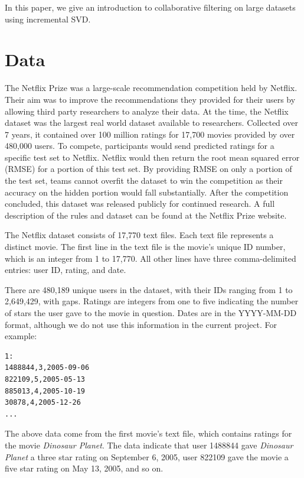 \documentclass{article} %
\begin{document}
In this paper, we give an introduction to collaborative filtering on large datasets using incremental SVD.

\section{Data}

The Netflix Prize was a large-scale recommendation competition held by Netflix.
Their aim was to improve the recommendations they provided for their users by allowing third party researchers to analyze their data.
At the time, the Netflix dataset was the largest real world dataset available to researchers.
Collected over 7 years, it contained over 100 million ratings for 17,700 movies provided by over 480,000 users.
To compete, participants would send predicted ratings for a specific test set to Netflix.
Netflix would then return the root mean squared error (RMSE) for a portion of this test set.
By providing RMSE on only a portion of the test set, teams cannot overfit the dataset to win the competition as their accuracy on the hidden portion would fall substantially.
After the competition concluded, this dataset was released publicly for continued research.
A full description of the rules and dataset can be found at the Netflix Prize website.


The Netflix dataset consists of 17,770 text files.
Each text file represents a distinct movie.
The first line in the text file is the movie's unique ID number, which is an integer from 1 to 17,770.
All other lines have three comma-delimited entries: user ID, rating, and date.

There are 480,189 unique users in the dataset, with their IDs ranging from 1 to 2,649,429, with gaps.
Ratings are integers from one to five indicating the number of stars the user gave to the movie in question.
Dates are in the YYYY-MM-DD format, although we do not use this information in the current project.
For example:

\begin{verbatim}
1:
1488844,3,2005-09-06
822109,5,2005-05-13
885013,4,2005-10-19
30878,4,2005-12-26
...
\end{verbatim}

The above data come from the first movie's text file, which contains ratings for the movie \emph{Dinosaur Planet}. The data indicate that user 1488844 gave \emph{Dinosaur Planet} a three star rating on September 6, 2005, user 822109 gave the movie a five star rating on May 13, 2005, and so on.
\end{document}
